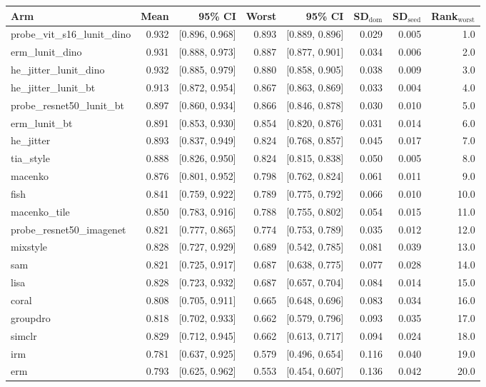 \begin{tabular}{lrrrrrrr}
\toprule
Arm & Mean & 95\% CI & Worst & 95\% CI & SD$_\text{dom}$ & SD$_\text{seed}$ & Rank$_\text{worst}$ \\
\midrule
probe\_vit\_s16\_lunit\_dino & 0.932 & [0.896, 0.968] & 0.893 & [0.889, 0.896] & 0.029 & 0.005 & 1.0 \\
erm\_lunit\_dino & 0.931 & [0.888, 0.973] & 0.887 & [0.877, 0.901] & 0.034 & 0.006 & 2.0 \\
he\_jitter\_lunit\_dino & 0.932 & [0.885, 0.979] & 0.880 & [0.858, 0.905] & 0.038 & 0.009 & 3.0 \\
he\_jitter\_lunit\_bt & 0.913 & [0.872, 0.954] & 0.867 & [0.863, 0.869] & 0.033 & 0.004 & 4.0 \\
probe\_resnet50\_lunit\_bt & 0.897 & [0.860, 0.934] & 0.866 & [0.846, 0.878] & 0.030 & 0.010 & 5.0 \\
erm\_lunit\_bt & 0.891 & [0.853, 0.930] & 0.854 & [0.820, 0.876] & 0.031 & 0.014 & 6.0 \\
he\_jitter & 0.893 & [0.837, 0.949] & 0.824 & [0.768, 0.857] & 0.045 & 0.017 & 7.0 \\
tia\_style & 0.888 & [0.826, 0.950] & 0.824 & [0.815, 0.838] & 0.050 & 0.005 & 8.0 \\
macenko & 0.876 & [0.801, 0.952] & 0.798 & [0.762, 0.824] & 0.061 & 0.011 & 9.0 \\
fish & 0.841 & [0.759, 0.922] & 0.789 & [0.775, 0.792] & 0.066 & 0.010 & 10.0 \\
macenko\_tile & 0.850 & [0.783, 0.916] & 0.788 & [0.755, 0.802] & 0.054 & 0.015 & 11.0 \\
probe\_resnet50\_imagenet & 0.821 & [0.777, 0.865] & 0.774 & [0.753, 0.789] & 0.035 & 0.012 & 12.0 \\
mixstyle & 0.828 & [0.727, 0.929] & 0.689 & [0.542, 0.785] & 0.081 & 0.039 & 13.0 \\
sam & 0.821 & [0.725, 0.917] & 0.687 & [0.638, 0.775] & 0.077 & 0.028 & 14.0 \\
lisa & 0.828 & [0.723, 0.932] & 0.687 & [0.657, 0.704] & 0.084 & 0.014 & 15.0 \\
coral & 0.808 & [0.705, 0.911] & 0.665 & [0.648, 0.696] & 0.083 & 0.034 & 16.0 \\
groupdro & 0.818 & [0.702, 0.933] & 0.662 & [0.579, 0.796] & 0.093 & 0.035 & 17.0 \\
simclr & 0.829 & [0.712, 0.945] & 0.662 & [0.613, 0.717] & 0.094 & 0.024 & 18.0 \\
irm & 0.781 & [0.637, 0.925] & 0.579 & [0.496, 0.654] & 0.116 & 0.040 & 19.0 \\
erm & 0.793 & [0.625, 0.962] & 0.553 & [0.454, 0.607] & 0.136 & 0.042 & 20.0 \\
\bottomrule
\end{tabular}

